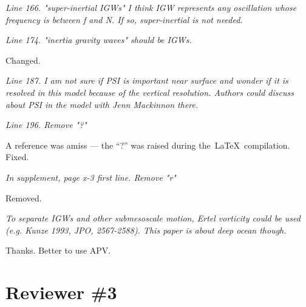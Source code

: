 \documentclass[11pt]{article}
\newcommand{\bdp}{\begin{description}}
\newcommand{\edp}{\end{description}}
\begin{document}
\begin{enumerate}

\item {\it Line 166. "super-inertial IGWs" I think IGW represents any oscillation whose
                frequency is between f and N. If so, super-inertial is not needed.}

\item {\it Line 174. "inertia gravity waves" should be IGWs.}

\bdp
   \item Changed.
\edp

\item {\it Line 187. I am not sure if PSI is important near surface and wonder if it
                is resolved in this model because of the vertical resolution.
                Authors could discuss about PSI in the model with Jenn Mackinnon there.}

\item {\it Line 196. Remove "?"}

\bdp
  \item A reference  was amiss --- the ``?'' was raised during the\, \LaTeX\, compilation. Fixed.
\edp

\item {\it In supplement, page x-3 first line. Remove "r"}

\bdp
  \item Removed.
\edp

\item {\it To separate IGWs and other submesoscale motion, Ertel vorticity could be
      used (e.g. Kunze 1993, JPO, 2567-2588). This paper is about deep ocean though.}

      \bdp
        \item Thanks. Better to use APV.
      \edp


\end{enumerate}

\section{Reviewer \#3}
\end{document}

